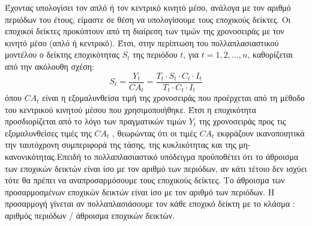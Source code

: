 Έχοντας υπολογίσει τον απλό ή τον κεντρικό κινητό μέσο, ανάλογα με τον
αριθμό περιόδων του έτους, είμαστε σε θέση να υπολογίσουμε τους
εποχικούς δείκτες. Οι εποχικοί δείκτες προκύπτουν από τη διαίρεση των
τιμών της χρονοσειράς με τον κινητό μέσο (απλό ή κεντρικό). Έτσι,
στην περίπτωση του πολλαπλασιαστικού μοντέλου ο δείκτης εποχικότητας $S_t$ της
περιόδου $t$, για $t = 1, 2,\ldots, n$, καθορίζεται από την ακόλουθη σχέση:
$$ S_t=\frac{Y_t}{CA_t}=\frac{T_t\cdot S_t \cdot C_t \cdot I_t}{T_t \cdot C_t \cdot I_t} $$
όπου $CA_t$ είναι η εξομαλυνθείσα τιμή της χρονοσειράς που προέρχεται από τη μέθοδο
του κεντρικού κινητού μέσου που χρησιμοποιήθηκε. Έτσι η εποχικότητα
προσδιορίζεται από το λόγο των πραγματικών τιμών $Y_t$ της χρονοσειράς προς τις
εξομαλυνθείσες τιμές της $CA_t$ , θεωρώντας ότι οι τιμές $CA_t$ εκφράζουν ικανοποιητικά
την ταυτόχρονη συμπεριφορά της τάσης, της κυκλικότητας και της μη-
κανονικότητας.Επειδή το πολλαπλασιαστικό υπόδειγμα προϋποθέτει ότι το άθροισμα των εποχικών δεικτών είναι ίσο με τον αριθμό των περιόδων, αν κάτι τέτοιο δεν ισχύει τότε θα πρέπει να αναπροσαρμόσουμε τους εποχικούς δείκτες. Το άθροισμα των προσαρμοσμένων εποχικών δεικτών είναι ίσο με τον αριθμό των περιόδων. Η
προσαρμογή γίνεται αν πολλαπλασιάσουμε τον κάθε εποχικό δείκτη με το κλάσμα : αριθμός περιόδων / άθροισμα εποχικών δεικτών.\\

